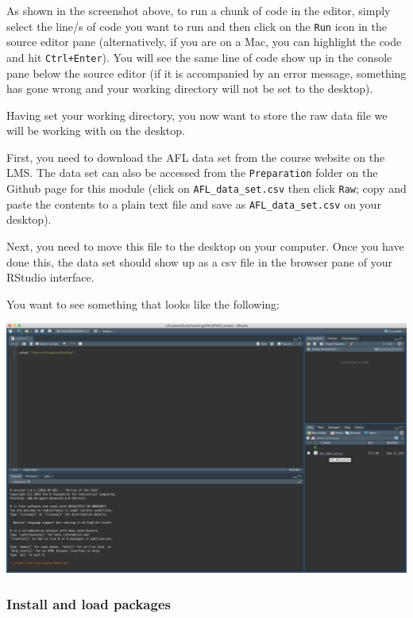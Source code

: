 \documentclass[
]{article}
\begin{document}
As shown in the screenshot above, to run a chunk of code in the editor,
simply select the line/s of code you want to run and then click on the
\texttt{Run} icon in the source editor pane (alternatively, if you are
on a Mac, you can highlight the code and hit \texttt{Ctrl+Enter}). You
will see the same line of code show up in the console pane below the
source editor (if it is accompanied by an error message, something has
gone wrong and your working directory will not be set to the desktop).

Having set your working directory, you now want to store the raw data
file we will be working with on the desktop.

First, you need to download the AFL data set from the course website on
the LMS. The data set can also be accessed from the \texttt{Preparation}
folder on the Github page for this module (click on
\texttt{AFL\_data\_set.csv} then click \texttt{Raw}; copy and paste the
contents to a plain text file and save as \texttt{AFL\_data\_set.csv} on
your desktop).

Next, you need to move this file to the desktop on your computer. Once
you have done this, the data set should show up as a csv file in the
browser pane of your RStudio interface.

You want to see something that looks like the following:

\includegraphics{Images/download_data.png}

\hypertarget{install-and-load-packages}{%
\subsubsection{Install and load
packages}\label{install-and-load-packages}}
\end{document}
